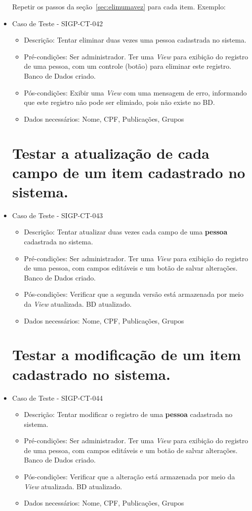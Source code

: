 \documentclass[11pt, a4paper]{book}
\begin{document}
\begin{itemize}
Repetir os passos da seção~\ref{sec:elimumavez} para cada item. Exemplo:

	\item Caso de Teste - SIGP-CT-042
	\begin{itemize}
	\item Descrição: Tentar eliminar duas vezes uma pessoa cadastrada no sistema.
	\item Pré-condições: Ser administrador. Ter uma \emph{View} para exibição do registro de uma pessoa, com um controle (botão) para eliminar este registro. Banco de Dados criado.
	\item Pós-condições: Exibir uma \emph{View} com uma mensagem de erro, informando que este registro não pode ser elimiado, pois não existe no BD.
	\item Dados necessários: Nome, CPF, Publicações, Grupos
	\end{itemize}

\newpage
\section{Testar a atualização de cada campo de um item cadastrado no sistema.}

	\item Caso de Teste - SIGP-CT-043
	\begin{itemize}
	\item Descrição: Tentar atualizar duas vezes cada campo de uma \textbf{pessoa} cadastrada no sistema.
	\item Pré-condições: Ser administrador. Ter uma \emph{View} para exibição do registro de uma pessoa, com campos editáveis e um botão de salvar alterações. Banco de Dados criado.
	\item Pós-condições: Verificar que a segunda versão está armazenada por meio da \emph{View} atualizada. BD atualizado.
	\item Dados necessários: Nome, CPF, Publicações, Grupos
	\end{itemize}

\newpage
\section{Testar a modificação de um item cadastrado no sistema.}
	\item Caso de Teste - SIGP-CT-044
	\begin{itemize}
	\item Descrição: Tentar modificar o registro de uma \textbf{pessoa} cadastrada no sistema.
	\item Pré-condições: Ser administrador. Ter uma \emph{View} para exibição do registro de uma pessoa, com campos editáveis e um botão de salvar alterações. Banco de Dados criado.
	\item Pós-condições: Verificar que a alteração está armazenada por meio da \emph{View} atualizada. BD atualizado.
	\item Dados necessários: Nome, CPF, Publicações, Grupos
	\end{itemize}



\end{itemize}
\end{document}
